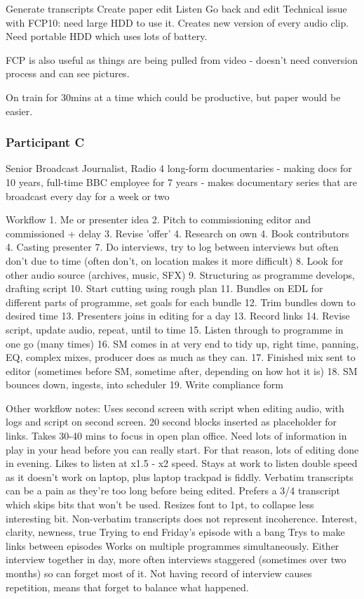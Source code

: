 Generate transcripts
Create paper edit
Listen
Go back and edit
Technical issue with FCP10: need large HDD to use it. Creates new version of
every audio clip. Need portable HDD which uses lots of battery.

FCP is also useful as things are being pulled from video - doesn't need
conversion process and can see pictures. 

On train for 30mins at a time which could be productive, but paper would be
easier.

\subsubsection{Participant C}
Senior Broadcast Journalist, Radio 4 long-form documentaries
- making docs for 10 years, full-time BBC employee for 7 years
- makes documentary series that are broadcast every day for a week or two

Workflow
1. Me or presenter idea
2. Pitch to commissioning editor and commissioned + delay
3. Revise 'offer'
4. Research on own
4. Book contributors
4. Casting presenter
7.  Do interviews, try to log between interviews but often don't due to time
(often don't, on location makes it more difficult)
8. Look for other audio source (archives, music, SFX)
9. Structuring as programme develops, drafting script
10. Start cutting using rough plan
11. Bundles on EDL for different parts of programme, set goals for each bundle
12. Trim bundles down to desired time
13. Presenters joins in editing for a day
13. Record links
14. Revise script, update audio, repeat, until to time
15. Listen through to programme in one go (many times)
16. SM comes in at very end to tidy up, right time, panning, EQ, complex mixes,
producer does as much as they can.
17. Finished mix sent to editor (sometimes before SM, sometime after, depending
on how hot it is)
18. SM bounces down, ingests, into scheduler
19. Write compliance form

Other workflow notes:
Uses second screen with script when editing audio, with logs and script on
second screen.
20 second blocks inserted as placeholder for links.
Takes 30-40 mins to focus in open plan office. Need lots of information in play
in your head before you can really start. For that reason, lots of editing done
in evening.
Likes to listen at x1.5 - x2 speed. Stays at work to listen double speed as it
doesn't work on laptop, plus laptop trackpad is fiddly.
Verbatim transcripts can be a pain as they're too long before being edited.
Prefers a 3/4 transcript which skips bits that won't be used. Resizes font to
1pt, to collapse less interesting bit. Non-verbatim transcripts does not
represent incoherence.
Interest, clarity, newness, true
Trying to end Friday's episode with a bang
Trys to make links between episodes
Works on multiple programmes simultaneously.
Either interview together in day, more often interviews staggered (sometimes
over two months) so can forget most of it. Not having record of interview
causes repetition, means that forget to balance what happened.

